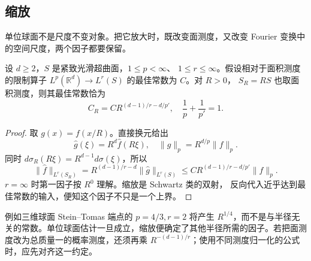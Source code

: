 \subsection{缩放}
\label{b2:subsec:230104}

单位球面不是尺度不变对象。把它放大时，既改变面测度，又改变 Fourier 变换中的空间尺度，两个因子都要保留。

\begin{proposition}[曲面半径的缩放]\label{b2:prop:23-surface-scaling}
设 \(d\geq2\)，\(S\) 是紧致光滑超曲面，\(1\leq p<\infty\)、
\(1\leq r\leq\infty\)。假设相对于面积测度的限制算子
\(L^p(\mathbb R^d)\to L^r(S)\) 的最佳常数为 \(C\)。对 \(R>0\)，
\(S_R=RS\) 也取面积测度，则其最佳常数恰为
\[
 C_R=C R^{(d-1)/r-d/p'},
 \quad \frac1p+\frac1{p'}=1.
\]
\end{proposition}
\begin{proof}
取 \(g(x)=f(x/R)\)。直接换元给出
\[
 \widehat g(\xi)=R^d\widehat f(R\xi),
 \quad \|g\|_p=R^{d/p}\|f\|_p.
\]
同时 \(d\sigma_R(R\xi)=R^{d-1}d\sigma(\xi)\)，所以
\[
 \|\widehat f\|_{L^r(S_R)}
 =R^{(d-1)/r-d}\|\widehat g\|_{L^r(S)}
 \leq C R^{(d-1)/r-d/p'}\|f\|_p.
\]
\(r=\infty\) 时第一因子按 \(R^0\) 理解。缩放是 Schwartz 类的双射，
反向代入近乎达到最佳常数的输入，便知这个因子不只是一个上界。
\end{proof}

例如三维球面 Stein–Tomas 端点的 \(p=4/3,r=2\) 将产生
\(R^{1/4}\)，而不是与半径无关的常数。单位球面估计一旦成立，缩放便确定了其他半径所需的因子。若把面测度改为总质量一的概率测度，还须再乘
\(R^{-(d-1)/r}\)；使用不同测度归一化的公式时，应先对齐这一约定。
